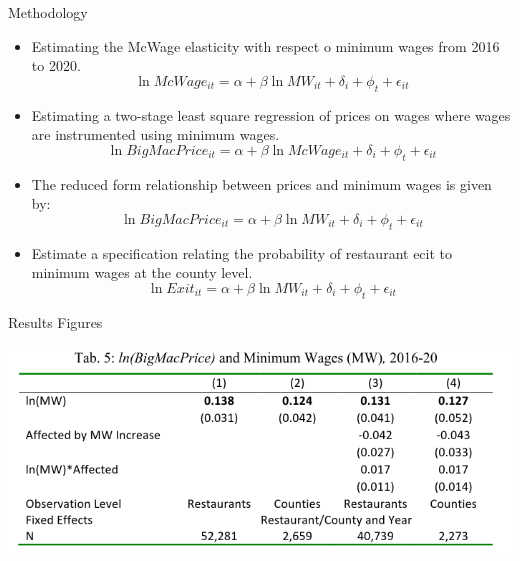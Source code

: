 \documentclass[12pt]{beamer}
\begin{document}
\begin{frame}[allowframebreaks]{Methodology}
	\begin{itemize}
		\item Estimating the McWage elasticity with respect o minimum wages from 2016 to 2020.
		      \begin{equation}
			      \ln{McWage_{it}} = \alpha + \beta \ln{MW_{it}} + \delta_{i} + \phi_{t} + \epsilon_{it}
		      \end{equation}
		\item Estimating a two-stage least square regression of prices on wages where wages are instrumented using minimum wages.
		      \begin{equation}
			      \ln{BigMacPrice_{it}} = \alpha + \beta \ln{McWage_{it}} + \delta_{i} + \phi_{t} + \epsilon_{it}
		      \end{equation}
		\item The reduced form relationship between prices and minimum wages is given by:
		      \begin{equation}
			      \ln{BigMacPrice_{it}} = \alpha + \beta \ln{MW_{it}} + \delta_{i} + \phi_{t} + \epsilon_{it}
		      \end{equation}
		\item Estimate a specification relating the probability of restaurant ecit to minimum wages at the county level.
		      \begin{equation}
			      \ln{Exit_{it}} = \alpha + \beta \ln{MW_{it}} + \delta_{i} + \phi_{t} + \epsilon_{it}
		      \end{equation}
	\end{itemize}

\end{frame}

\begin{frame}[allowframebreaks]{Results Figures}
	\begin{center}
		\includegraphics[width=1.0\linewidth]{assets/results.png}
	\end{center}
\end{frame}
\end{document}
